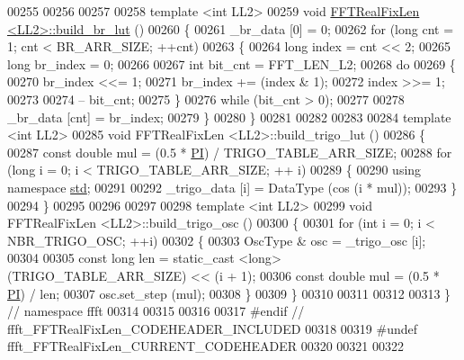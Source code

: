\begin{DoxyCode}
00255 
00256 
00257 
00258 \textcolor{keyword}{template} <\textcolor{keywordtype}{int} LL2>
00259 \textcolor{keywordtype}{void}    \hyperlink{a00011}{FFTRealFixLen <LL2>::build\_br\_lut} ()
00260 \{
00261     \_br\_data [0] = 0;
00262     \textcolor{keywordflow}{for} (\textcolor{keywordtype}{long} cnt = 1; cnt < BR\_ARR\_SIZE; ++cnt)
00263     \{
00264         \textcolor{keywordtype}{long}                index = cnt << 2;
00265         \textcolor{keywordtype}{long}                br\_index = 0;
00266 
00267         \textcolor{keywordtype}{int}             bit\_cnt = FFT\_LEN\_L2;
00268         \textcolor{keywordflow}{do}
00269         \{
00270             br\_index <<= 1;
00271             br\_index += (index & 1);
00272             index >>= 1;
00273 
00274             -- bit\_cnt;
00275         \}
00276         \textcolor{keywordflow}{while} (bit\_cnt > 0);
00277 
00278         \_br\_data [cnt] = br\_index;
00279     \}
00280 \}
00281 
00282 
00283 
00284 \textcolor{keyword}{template} <\textcolor{keywordtype}{int} LL2>
00285 \textcolor{keywordtype}{void}    FFTRealFixLen <LL2>::build\_trigo\_lut ()
00286 \{
00287     \textcolor{keyword}{const} \textcolor{keywordtype}{double}    mul = (0.5 * \hyperlink{a00142_a74ffcd4c90202b5240bbca7374dfd6fa}{PI}) / TRIGO\_TABLE\_ARR\_SIZE;
00288     \textcolor{keywordflow}{for} (\textcolor{keywordtype}{long} i = 0; i < TRIGO\_TABLE\_ARR\_SIZE; ++ i)
00289     \{
00290         \textcolor{keyword}{using namespace }\hyperlink{a00144}{std};
00291 
00292         \_trigo\_data [i] = DataType (cos (i * mul));
00293     \}
00294 \}
00295 
00296 
00297 
00298 \textcolor{keyword}{template} <\textcolor{keywordtype}{int} LL2>
00299 \textcolor{keywordtype}{void}    FFTRealFixLen <LL2>::build\_trigo\_osc ()
00300 \{
00301     \textcolor{keywordflow}{for} (\textcolor{keywordtype}{int} i = 0; i < NBR\_TRIGO\_OSC; ++i)
00302     \{
00303         OscType &       osc = \_trigo\_osc [i];
00304 
00305         \textcolor{keyword}{const} \textcolor{keywordtype}{long}      len = static\_cast <\textcolor{keywordtype}{long}> (TRIGO\_TABLE\_ARR\_SIZE) << (i + 1);
00306         \textcolor{keyword}{const} \textcolor{keywordtype}{double}    mul = (0.5 * \hyperlink{a00142_a74ffcd4c90202b5240bbca7374dfd6fa}{PI}) / len;
00307         osc.set\_step (mul);
00308     \}
00309 \}
00310 
00311 
00312 
00313 \}   \textcolor{comment}{// namespace ffft}
00314 
00315 
00316 
00317 \textcolor{preprocessor}{#endif  // ffft\_FFTRealFixLen\_CODEHEADER\_INCLUDED}
00318 
00319 \textcolor{preprocessor}{#undef ffft\_FFTRealFixLen\_CURRENT\_CODEHEADER}
00320 
00321 
00322 

\end{DoxyCode}
